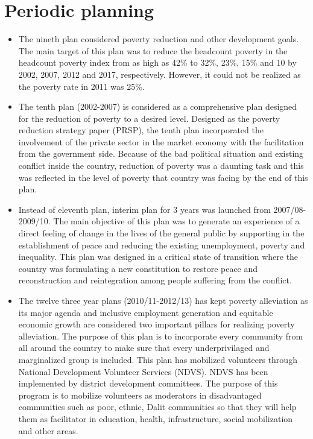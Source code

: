 \documentclass[
  openany]{book}
\providecommand{\tightlist}{%
  \setlength{\itemsep}{0pt}\setlength{\parskip}{0pt}}
\begin{document}
\hypertarget{periodic-planning}{%
\section{Periodic planning}\label{periodic-planning}}

\begin{itemize}
\tightlist
\item
  The nineth plan considered poverty reduction and other development goals. The main target of this plan was to reduce the headcount poverty in the headcount poverty index from as high as 42\% to 32\%, 23\%, 15\% and 10 by 2002, 2007, 2012 and 2017, respectively. However, it could not be realized as the poverty rate in 2011 was 25\%.
\item
  The tenth plan (2002-2007) is considered as a comprehensive plan designed for the reduction of poverty to a desired level. Designed as the poverty reduction strategy paper (PRSP), the tenth plan incorporated the involvement of the private sector in the market economy with the facilitation from the government side. Because of the bad political situation and existing conflict inside the country, reduction of poverty was a daunting task and this was reflected in the level of poverty that country was facing by the end of this plan.
\item
  Instead of eleventh plan, interim plan for 3 years was launched from 2007/08-2009/10. The main objective of this plan was to generate an experience of a direct feeling of change in the lives of the general public by supporting in the establishment of peace and reducing the existing unemployment, poverty and inequality. This plan was designed in a critical state of transition where the country was formulating a new constitution to restore peace and reconstruction and reintegration among people suffering from the conflict.
\item
  The twelve three year plans (2010/11-2012/13) has kept poverty alleviation as its major agenda and inclusive employment generation and equitable economic growth are considered two important pillars for realizing poverty alleviation. The purpose of this plan is to incorporate every community from all around the country to make sure that every underprivilaged and marginalized group is included. This plan has mobilized volunteers through National Development Volunteer Services (NDVS). NDVS has been implemented by district development committees. The purpose of this program is to mobilize volunteers as moderators in disadvantaged communities such as poor, ethnic, Dalit communities so that they will help them as facilitator in education, health, infrastructure, social mobilization and other areas.
\end{itemize}
\end{document}
